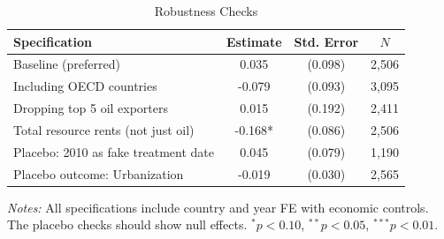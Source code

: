 \begin{table}[H]
\centering
\caption{Robustness Checks}
\label{tab:robustness}
\begin{threeparttable}
\begin{tabular}{lccc}
\toprule
Specification & Estimate & Std. Error & $N$ \\
\midrule
Baseline (preferred) & 0.035 & (0.098) & 2,506 \\
Including OECD countries & -0.079 & (0.093) & 3,095 \\
Dropping top 5 oil exporters & 0.015 & (0.192) & 2,411 \\
Total resource rents (not just oil) & -0.168* & (0.086) & 2,506 \\
Placebo: 2010 as fake treatment date & 0.045 & (0.079) & 1,190 \\
Placebo outcome: Urbanization & -0.019 & (0.030) & 2,565 \\
\bottomrule
\end{tabular}
\begin{tablenotes}\small
\item \textit{Notes:} All specifications include country and year FE with economic controls. The placebo checks should show null effects. $^{*}p<0.10$, $^{**}p<0.05$, $^{***}p<0.01$.
\end{tablenotes}
\end{threeparttable}
\end{table}
